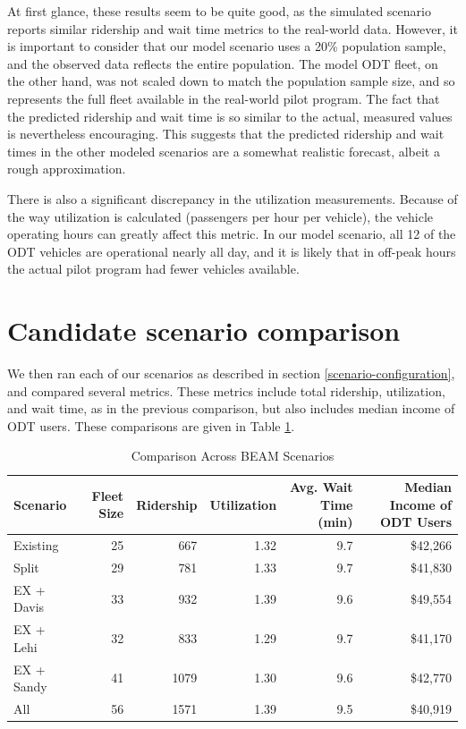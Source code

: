 \documentclass[
]{report}
\begin{document}
At first glance, these results seem to be quite good, as the simulated scenario reports similar ridership and wait time metrics to the real-world data. However, it is important to consider that our model scenario uses a 20\% population sample, and the observed data reflects the entire population. The model ODT fleet, on the other hand, was not scaled down to match the population sample size, and so represents the full fleet available in the real-world pilot program. The fact that the predicted ridership and wait time is so similar to the actual, measured values is nevertheless encouraging. This suggests that the predicted ridership and wait times in the other modeled scenarios are a somewhat realistic forecast, albeit a rough approximation.

There is also a significant discrepancy in the utilization measurements. Because of the way utilization is calculated (passengers per hour per vehicle), the vehicle operating hours can greatly affect this metric. In our model scenario, all 12 of the ODT vehicles are operational nearly all day, and it is likely that in off-peak hours the actual pilot program had fewer vehicles available.

\hypertarget{candidate-scenario-comparison}{%
\section{Candidate scenario comparison}\label{candidate-scenario-comparison}}

We then ran each of our scenarios as described in section \ref{scenario-configuration}, and compared several metrics. These metrics include total ridership, utilization, and wait time, as in the previous comparison, but also includes median income of ODT users. These comparisons are given in Table \ref{tab:scenario-compare}.

\begin{table}

\caption{\label{tab:scenario-compare}Comparison Across BEAM Scenarios}
\centering
\begin{tabular}[t]{lrrrrr}
\toprule
Scenario & Fleet Size & Ridership & Utilization & Avg. Wait Time (min) & Median Income of ODT Users\\
\midrule
Existing & 25 & 667 & 1.32 & 9.7 & \$42,266\\
Split & 29 & 781 & 1.33 & 9.7 & \$41,830\\
EX + Davis & 33 & 932 & 1.39 & 9.6 & \$49,554\\
EX + Lehi & 32 & 833 & 1.29 & 9.7 & \$41,170\\
EX + Sandy & 41 & 1079 & 1.30 & 9.6 & \$42,770\\
\addlinespace
All & 56 & 1571 & 1.39 & 9.5 & \$40,919\\
\bottomrule
\end{tabular}
\end{table}
\end{document}
